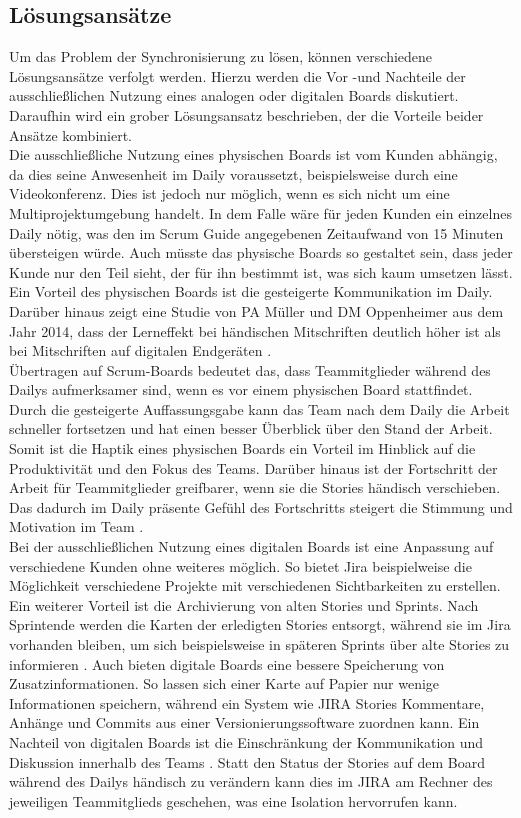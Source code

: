 \documentclass[12pt,titlepage]{scrartcl}
\begin{document}
		\subsection{Lösungsansätze} \label{loesungsansaetze}
		Um das Problem der Synchronisierung zu lösen, können verschiedene Lösungsansätze verfolgt werden. Hierzu werden die Vor -und Nachteile der ausschließlichen Nutzung eines analogen oder digitalen Boards diskutiert. Daraufhin wird ein grober Lösungsansatz beschrieben, der die Vorteile beider Ansätze kombiniert. \\
		Die ausschließliche Nutzung eines physischen Boards ist vom Kunden abhängig, da dies seine Anwesenheit im Daily voraussetzt, beispielsweise durch eine Videokonferenz. Dies ist jedoch nur möglich, wenn es sich nicht um eine Multiprojektumgebung handelt. In dem Falle wäre für jeden Kunden ein einzelnes Daily nötig, was den im Scrum Guide angegebenen Zeitaufwand von 15 Minuten übersteigen würde. Auch müsste das physische Boards so gestaltet sein, dass jeder Kunde nur den Teil sieht, der für ihn bestimmt ist, was sich kaum umsetzen lässt. Ein Vorteil des physischen Boards ist die gesteigerte Kommunikation im Daily. Darüber hinaus zeigt eine Studie von PA Müller und DM Oppenheimer aus dem Jahr 2014, dass der Lerneffekt bei händischen Mitschriften deutlich höher ist als bei Mitschriften auf digitalen Endgeräten \cite{pen}. \\
		Übertragen auf Scrum-Boards bedeutet das, dass Teammitglieder während des Dailys aufmerksamer sind, wenn es vor einem physischen Board stattfindet. Durch die gesteigerte Auffassungsgabe kann das Team nach dem Daily die Arbeit schneller fortsetzen und hat einen besser Überblick über den Stand der Arbeit. Somit ist die Haptik eines physischen Boards ein Vorteil im Hinblick auf die Produktivität und den Fokus des Teams. Darüber hinaus ist der Fortschritt der Arbeit für Teammitglieder greifbarer, wenn sie die Stories händisch verschieben. Das dadurch im Daily präsente Gefühl des Fortschritts steigert die Stimmung und Motivation im Team \cite{progress}.\\
		Bei der ausschließlichen Nutzung eines digitalen Boards ist eine Anpassung auf verschiedene Kunden ohne weiteres möglich. So bietet Jira beispielweise die Möglichkeit verschiedene Projekte mit verschiedenen Sichtbarkeiten zu erstellen. Ein weiterer Vorteil ist die Archivierung von alten Stories und Sprints. Nach Sprintende werden die Karten der erledigten Stories entsorgt, während sie im Jira vorhanden bleiben, um sich beispielsweise in späteren Sprints über alte Stories zu informieren \cite{softtools}. Auch bieten digitale Boards eine bessere Speicherung von Zusatzinformationen. So lassen sich einer Karte auf Papier nur wenige Informationen speichern, während ein System wie JIRA Stories Kommentare, Anhänge und Commits aus einer Versionierungssoftware zuordnen kann. Ein Nachteil von digitalen Boards ist die Einschränkung der Kommunikation und Diskussion innerhalb des Teams \cite{drift}. Statt den Status der Stories auf dem Board während des Dailys händisch zu verändern kann dies im JIRA am Rechner des jeweiligen Teammitglieds geschehen, was eine Isolation hervorrufen kann. \\
\end{document}
